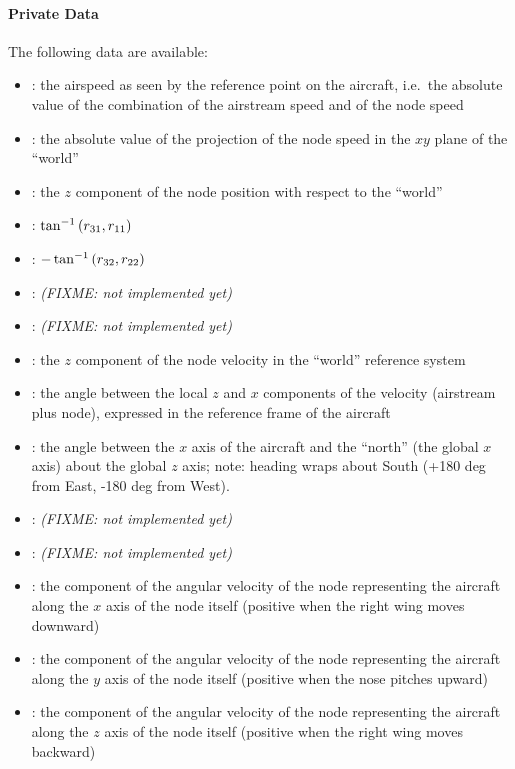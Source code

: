 \paragraph{Private Data}
The following data are available:
\begin{itemize}
\item {}: the airspeed as seen by the reference 
	point on the aircraft, i.e.\ the absolute value
	of the combination of the airstream speed and of the node speed
\item {}: the absolute value of the projection
	of the node speed in the $xy$ plane of the ``world''
\item {}: the $z$ component of the node position
	with respect to the ``world''
\item {}: $\tan^{-1}\left( r_{31}, r_{11} \right)$
\item {}: $-\tan^{-1}\left( r_{32}, r_{22} \right)$
\item {}: \emph{(FIXME: not implemented yet)}
\item {}: \emph{(FIXME: not implemented yet)}
\item {}: the $z$ component of the node velocity
	in the ``world'' reference system
\item {}: the angle between the local $z$ and $x$ components
	of the velocity (airstream plus node),
	expressed in the reference frame of the aircraft
\item {}: the angle between the $x$ axis of the aircraft 
	and the ``north'' (the global $x$ axis) about the global $z$ axis;
	note: heading wraps about South
	(+180 deg from East, -180 deg from West).
\item {}: \emph{(FIXME: not implemented yet)}
\item {}: \emph{(FIXME: not implemented yet)}
\item {}: the component of the angular velocity
	of the node representing the aircraft along the $x$ axis
	of the node itself (positive when the right wing moves downward)
\item {}: the component of the angular velocity
	of the node representing the aircraft along the $y$ axis
	of the node itself (positive when the nose pitches upward)
\item {}: the component of the angular velocity
	of the node representing the aircraft along the $z$ axis
	of the node itself (positive when the right wing moves backward)
\end{itemize}

